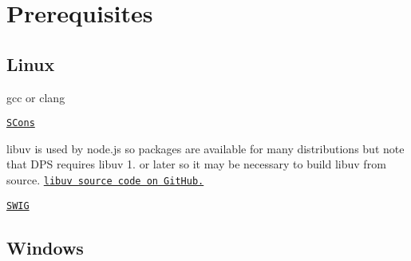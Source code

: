 \hypertarget{building-and-running_prerequisites}{}\section{Prerequisites}\label{building-and-running_prerequisites}
\hypertarget{building-and-running_prerequisites-linux}{}\subsection{Linux}\label{building-and-running_prerequisites-linux}

\begin{DoxyItemize}
\item gcc or clang
\item \href{http://scons.org/pages/download.html}{\tt S\+Cons}
\item libuv is used by node.\+js so packages are available for many distributions but note that D\+PS requires libuv 1. or later so it may be necessary to build libuv from source. \href{https://github.com/libuv}{\tt libuv source code on Git\+Hub.}
\item \href{http://www.swig.org/download.html}{\tt S\+W\+IG}
\end{DoxyItemize}\hypertarget{building-and-running_prerequisites-windows}{}\subsection{Windows}\label{building-and-running_prerequisites-windows}


